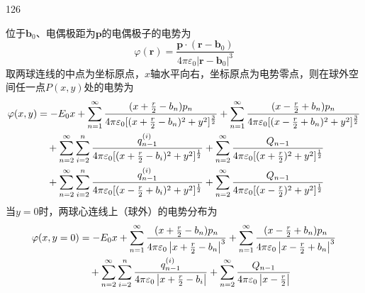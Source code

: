 \begin{solution}{126}
\begin{subsolution}
        位于$\boldsymbol { b } _ { 0 }$、电偶极距为$\boldsymbol { p }$的电偶极子的电势为
        \begin{equation}
            \varphi (\boldsymbol {r}) = \frac {\boldsymbol {p} \cdot (\boldsymbol {r} - \boldsymbol {b} _ {0})}{4 \pi \varepsilon_ {0} | \boldsymbol {r} - \boldsymbol {b} _ {0} | ^ {3}}
            \label{eq:30.s126}
        \end{equation}
        取两球连线的中点为坐标原点，$x$轴水平向右，坐标原点为电势零点，则在球外空间任一点$P ( x , y )$处的电势为
        \begin{align}
            \varphi (x, y) &= - E _ {0} x + \sum_ {n = 1} ^ {\infty} \frac {(x + \frac {r}{2} - b _ {n}) p _ {n}}{4 \pi \varepsilon_ {0} [ (x + \frac {r}{2} - b _ {n}) ^ {2} + y ^ {2} ] ^ {\frac {3}{2}}} + \sum_ {n = 1} ^ {\infty} \frac {(x - \frac {r}{2} + b _ {n}) p _ {n}}{4 \pi \varepsilon_ {0} [ (x - \frac {r}{2} + b _ {n}) ^ {2} + y ^ {2} ] ^ {\frac {3}{2}}} \notag \\
            &\quad + \sum_ {n = 2} ^ {\infty} \sum_ {i = 2} ^ {n} \frac {q _ {n - 1} ^ {(i)}}{4 \pi \varepsilon_ {0} [ (x + \frac {r}{2} - b _ {i}) ^ {2} + y ^ {2} ] ^ {\frac {1}{2}}} + \sum_ {n = 2} ^ {\infty} \frac {Q _ {n - 1}}{4 \pi \varepsilon_ {0} [ (x + \frac {r}{2}) ^ {2} + y ^ {2} ] ^ {\frac {1}{2}}} \notag \\
            &\quad + \sum_ {n = 2} ^ {\infty} \sum_ {i = 2} ^ {n} \frac {q _ {n - 1} ^ {(i)}}{4 \pi \varepsilon_ {0} [ (x - \frac {r}{2} + b _ {i}) ^ {2} + y ^ {2} ] ^ {\frac {1}{2}}} + \sum_ {n = 2} ^ {\infty} \frac {Q _ {n - 1}}{4 \pi \varepsilon_ {0} [ (x - \frac {r}{2}) ^ {2} + y ^ {2} ] ^ {\frac {1}{2}}}
            \label{eq:31.s126}
        \end{align}
        当$y = 0$时，两球心连线上（球外）的电势分布为
        \begin{align}
            \varphi (x, y = 0) &= - E _ {0} x + \sum_ {n = 1} ^ {\infty} \frac {(x + \frac {r}{2} - b _ {n}) p _ {n}}{4 \pi \varepsilon_ {0} \left| x + \frac {r}{2} - b _ {n} \right| ^ {3}} + \sum_ {n = 1} ^ {\infty} \frac {(x - \frac {r}{2} + b _ {n}) p _ {n}}{4 \pi \varepsilon_ {0} \left| x - \frac {r}{2} + b _ {n} \right| ^ {3}} \notag \\
            &\quad + \sum_ {n = 2} ^ {\infty} \sum_ {i = 2} ^ {n} \frac {q _ {n - 1} ^ {(i)}}{4 \pi \varepsilon_ {0} \left| x + \frac {r}{2} - b _ {i} \right|} + \sum_ {n = 2} ^ {\infty} \frac {Q _ {n - 1}}{4 \pi \varepsilon_ {0} \left| x - \frac {r}{2} \right|} \notag \\

\end{align}
\end{subsolution}
\end{solution}
